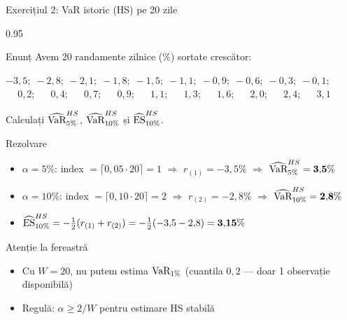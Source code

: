 \documentclass[9pt, aspectratio=169, t]{beamer}
\begin{document}
\begin{frame}[shrink=10]{Exercițiul 2: VaR istoric (HS) pe 20 zile}
    \begin{cminipage}{0.95\textwidth}
    \begin{block}{Enunț}
    Avem 20 randamente zilnice (\%) sortate crescător:
    \begin{center}
    \footnotesize
    $-3{,}5;\; -2{,}8;\; -2{,}1;\; -1{,}8;\; -1{,}5;\; -1{,}1;\; -0{,}9;\; -0{,}6;\; -0{,}3;\; -0{,}1;$ \\
    $\phantom{-}0{,}2;\; \phantom{-}0{,}4;\; \phantom{-}0{,}7;\; \phantom{-}0{,}9;\; \phantom{-}1{,}1;\; \phantom{-}1{,}3;\; \phantom{-}1{,}6;\; \phantom{-}2{,}0;\; \phantom{-}2{,}4;\; \phantom{-}3{,}1$
    \end{center}
    Calculați $\widehat{\text{VaR}}_{5\%}^{HS}$, $\widehat{\text{VaR}}_{10\%}^{HS}$ și $\widehat{\text{ES}}_{10\%}^{HS}$.
    \end{block}
    \vspace{0.1cm}
    \begin{exampleblock}{Rezolvare}
    \begin{itemize}\setlength{\itemsep}{0pt}
        \item $\alpha = 5\%$: index $= \lceil 0{,}05 \cdot 20\rceil = 1$ $\Rightarrow$ $r_{(1)} = -3{,}5\%$ $\Rightarrow$ $\widehat{\text{VaR}}_{5\%}^{HS} = \mathbf{3{,}5\%}$
        \item $\alpha = 10\%$: index $= \lceil 0{,}10 \cdot 20\rceil = 2$ $\Rightarrow$ $r_{(2)} = -2{,}8\%$ $\Rightarrow$ $\widehat{\text{VaR}}_{10\%}^{HS} = \mathbf{2{,}8\%}$
        \item $\widehat{\text{ES}}_{10\%}^{HS} = -\frac{1}{2}(r_{(1)} + r_{(2)}) = -\frac{1}{2}(-3{,}5 - 2{,}8) = \mathbf{3{,}15\%}$
    \end{itemize}
    \end{exampleblock}
    \begin{alertblock}{Atenție la fereastră}
    \begin{itemize}\setlength{\itemsep}{0pt}
        \item Cu $W = 20$, nu putem estima $\text{VaR}_{1\%}$ (cuantila $0{,}2$ --- doar 1 observație disponibilă)
        \item Regulă: $\alpha \geq 2/W$ pentru estimare HS stabilă
    \end{itemize}
    \end{alertblock}
    \end{cminipage}
\end{frame}
\end{document}
